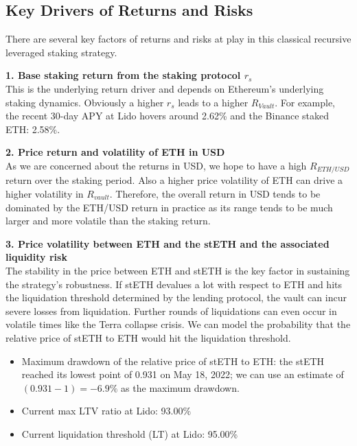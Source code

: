 \documentclass[11pt, a4paper]{article}
\begin{document}
\subsection*{Key Drivers of Returns and Risks}
There are several key factors of returns and risks at play in this classical recursive leveraged staking strategy.

\textbf{1. Base staking return from the staking protocol $r_s$} \\
This is the underlying return driver and depends on Ethereum's underlying staking dynamics. Obviously a higher $r_s$ leads to a higher $R_{Vault}$. For example, the recent 30-day APY at Lido hovers around 2.62\% and the Binance staked ETH: 2.58\%.

\textbf{2. Price return and volatility of ETH in USD} \\
As we are concerned about the returns in USD, we hope to have a high $R_{ETH/USD}$ return over the staking period. Also a higher price volatility of ETH can drive a higher volatility in $R_{vault}$. Therefore, the overall return in USD tends to be dominated by the ETH/USD return in practice as its range tends to be much larger and more volatile than the staking return.

\textbf{3. Price volatility between ETH and the stETH and the associated liquidity risk} \\
The stability in the price between ETH and stETH is the key factor in sustaining the strategy's robustness. If stETH devalues a lot with respect to ETH and hits the liquidation threshold determined by the lending protocol, the vault can incur severe losses from liquidation. Further rounds of liquidations can even occur in volatile times like the Terra collapse crisis. We can model the probability that the relative price of stETH to ETH would hit the liquidation threshold. 
\begin{itemize}
    \item Maximum drawdown of the relative price of stETH to ETH: the stETH reached its lowest point of 0.931 on May 18, 2022; we can use an estimate of $(0.931 - 1) = -6.9\%$ as the maximum drawdown.
    \item Current max LTV ratio at Lido: 93.00\%
    \item Current liquidation threshold (LT) at Lido: 95.00\%
\end{itemize}
\end{document}
